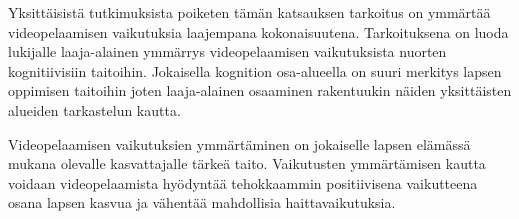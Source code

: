 \documentclass[utf8,bachelor]{gradu3}
\begin{document}
Yksittäisistä tutkimuksista poiketen tämän katsauksen tarkoitus on ymmärtää videopelaamisen vaikutuksia laajempana kokonaisuutena. Tarkoituksena on luoda lukijalle laaja-alainen ymmärrys videopelaamisen vaikutuksista nuorten kognitiivisiin taitoihin. Jokaisella kognition osa-alueella on suuri merkitys lapsen oppimisen taitoihin joten laaja-alainen osaaminen rakentuukin näiden yksittäisten alueiden tarkastelun kautta.  

Videopelaamisen vaikutuksien ymmärtäminen on jokaiselle lapsen elämässä mukana olevalle kasvattajalle tärkeä taito. Vaikutusten ymmärtämisen kautta voidaan videopelaamista hyödyntää tehokkaammin positiivisena vaikutteena osana lapsen kasvua ja vähentää mahdollisia haittavaikutuksia. 

\printbibliography
\end{document}
